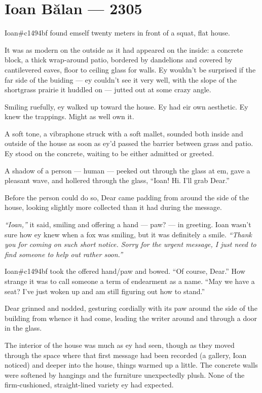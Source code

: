 \hypertarget{ioan-bux103lan-2305}{%
\chapter*{Ioan Bălan — 2305}\label{ioan-bux103lan-2305}}

Ioan\#c1494bf found emself twenty meters in front of a squat, flat house.

It was as modern on the outside as it had appeared on the inside: a concrete block, a thick wrap-around patio, bordered by dandelions and covered by cantilevered eaves, floor to ceiling glass for walls. Ey wouldn't be surprised if the far side of the buiding — ey couldn't see it very well, with the slope of the shortgrass prairie it huddled on — jutted out at some crazy angle.

Smiling ruefully, ey walked up toward the house. Ey had eir own aesthetic. Ey knew the trappings. Might as well own it.

A soft tone, a vibraphone struck with a soft mallet, sounded both inside and outside of the house as soon as ey'd passed the barrier between grass and patio. Ey stood on the concrete, waiting to be either admitted or greeted.

A shadow of a person — human — peeked out through the glass at em, gave a pleasant wave, and hollered through the glass, ``Ioan! Hi. I'll grab Dear.''

Before the person could do so, Dear came padding from around the side of the house, looking slightly more collected than it had during the message.

\emph{``Ioan,''} it said, smiling and offering a hand — paw? — in greeting. Ioan wasn't sure how ey knew when a fox was smiling, but it was definitely a smile. \emph{``Thank you for coming on such short notice. Sorry for the urgent message, I just need to find someone to help out rather soon.''}

Ioan\#c1494bf took the offered hand/paw and bowed. ``Of course, Dear.'' How strange it was to call someone a term of endearment as a name. ``May we have a seat? I've just woken up and am still figuring out how to stand.''

Dear grinned and nodded, gesturing cordially with its paw around the side of the building from whence it had come, leading the writer around and through a door in the glass.

The interior of the house was much as ey had seen, though as they moved through the space where that first message had been recorded (a gallery, Ioan noticed) and deeper into the house, things warmed up a little. The concrete walls were softened by hangings and the furniture unexpectedly plush. None of the firm-cushioned, straight-lined variety ey had expected.

